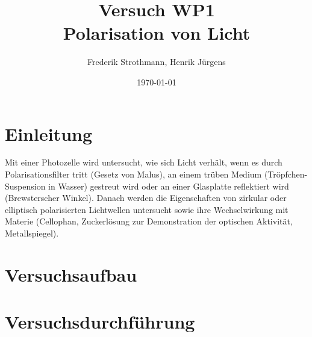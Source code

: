 \documentclass[12pt]{scrartcl}
\title{Versuch WP1\\ Polarisation von Licht}
\author{Frederik Strothmann, Henrik Jürgens}
\date{\today}
\begin{document}

\maketitle
\tableofcontents
\newpage


\section{Einleitung}
Mit einer Photozelle wird untersucht, wie sich Licht verhält, wenn es durch Polarisationsfilter tritt (Gesetz von Malus), an einem trüben Medium (Tröpfchen-Suspension in Wasser) gestreut wird oder an einer Glasplatte reflektiert wird (Brewsterscher Winkel).
Danach werden die Eigenschaften von zirkular oder elliptisch polarisierten Lichtwellen untersucht sowie ihre Wechselwirkung mit Materie (Cellophan, Zuckerlösung zur Demonstration der optischen Aktivität, Metallspiegel). 


\section{Versuchsaufbau}


\section{Versuchsdurchführung}
\end{document}
